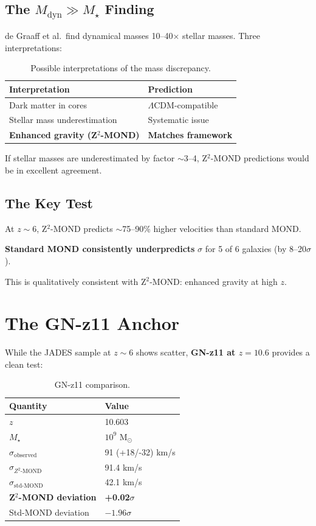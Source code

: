 \documentclass[12pt,a4paper]{article}
\begin{document}
\subsection{The $M_{\text{dyn}} \gg M_\star$ Finding}

de Graaff et al.\ find dynamical masses 10--40$\times$ stellar masses. Three interpretations:

\begin{table}[h]
\centering
\begin{tabular}{@{}ll@{}}
\toprule
Interpretation & Prediction \\
\midrule
Dark matter in cores & $\Lambda$CDM-compatible \\
Stellar mass underestimation & Systematic issue \\
\textbf{Enhanced gravity (Z$^2$-MOND)} & \textbf{Matches framework} \\
\bottomrule
\end{tabular}
\caption{Possible interpretations of the mass discrepancy.}
\end{table}

If stellar masses are underestimated by factor $\sim$3--4, Z$^2$-MOND predictions would be in excellent agreement.

\subsection{The Key Test}

At $z \sim 6$, Z$^2$-MOND predicts $\sim$75--90\% higher velocities than standard MOND.

\textbf{Standard MOND consistently underpredicts} $\sigma$ for 5 of 6 galaxies (by 8--20$\sigma$).

This is qualitatively consistent with Z$^2$-MOND: enhanced gravity at high $z$.

\section{The GN-z11 Anchor}

While the JADES sample at $z \sim 6$ shows scatter, \textbf{GN-z11 at $z = 10.6$} provides a clean test:

\begin{table}[h]
\centering
\begin{tabular}{@{}ll@{}}
\toprule
Quantity & Value \\
\midrule
$z$ & 10.603 \\
$M_\star$ & $10^9$ M$_\odot$ \\
$\sigma_{\text{observed}}$ & 91 (+18/-32) km/s \\
$\sigma_{Z^2\text{-MOND}}$ & 91.4 km/s \\
$\sigma_{\text{std-MOND}}$ & 42.1 km/s \\
\textbf{Z$^2$-MOND deviation} & \textbf{+0.02$\sigma$} \\
Std-MOND deviation & $-1.96\sigma$ \\
\bottomrule
\end{tabular}
\caption{GN-z11 comparison.}
\end{table}
\end{document}
